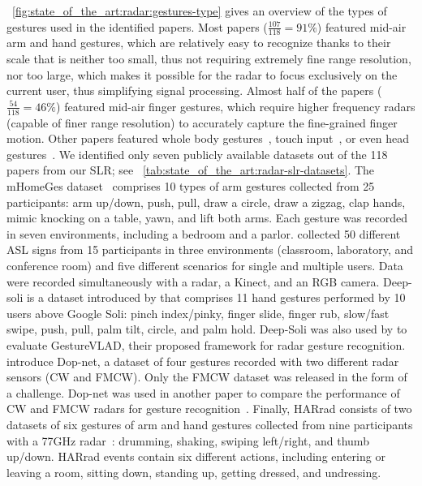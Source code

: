 \fig~\ref{fig:state_of_the_art:radar:gestures-type} gives an overview of the types of gestures used in the identified papers. Most papers ($\frac{107}{118}=91\%$) featured mid-air arm and hand gestures, which are relatively easy to recognize thanks to their scale that is neither too small, thus not requiring extremely fine range resolution, nor too large, which makes it possible for the radar to focus exclusively on the current user, thus simplifying signal processing. Almost half of the papers ($\frac{54}{118}=46\%$) featured mid-air finger gestures, which require higher frequency radars (capable of finer range resolution) to accurately capture the fine-grained finger motion. Other papers featured whole body gestures~\cite{Li:2009,Li:2020b,Vandersmissen:2020}, touch input~\cite{Copic:2019,Wu:2020}, or even head gestures~\cite{Wan:2014}.
%
We identified only seven publicly available datasets out of the 118 papers from our SLR; see \tab~\ref{tab:state_of_the_art:radar-slr-datasets}. 
The mHomeGes dataset~\cite{Liu:2020b} comprises 10 types of arm gestures collected from 25 participants: arm up/down, push, pull, draw a circle, draw a zigzag, clap hands, mimic knocking on a table, yawn, and lift both arms. Each gesture was recorded in seven environments, including a bedroom and a parlor.
\cite{Santhalingam:2020b} collected 50 different ASL signs from 15 participants in three environments (classroom, laboratory, and conference room) and five different scenarios for single and multiple users. Data were recorded simultaneously with a radar, a Kinect, and an RGB camera.
%
Deep-soli is a dataset introduced by \cite{Wang:2016} that comprises 11 hand gestures performed by 10 users above Google Soli: pinch index/pinky, finger slide, finger rub, slow/fast swipe, push, pull, palm tilt, circle, and palm hold. Deep-Soli was also used by \cite{Berenguer:2019} to evaluate GestureVLAD, their proposed framework for radar gesture recognition.
%
\cite{Ritchie:2020} introduce Dop-net, a dataset of four gestures recorded with two different radar sensors (CW and FMCW). Only the FMCW dataset was released in the form of a challenge. Dop-net was used in another paper to compare the performance of CW and FMCW radars for gesture recognition~\cite{Bannon:2020}.
%
Finally, HARrad consists of two datasets of six gestures of arm and hand gestures collected from nine participants with a 77GHz radar~\cite{Vandersmissen:2020}: drumming, shaking, swiping left/right, and thumb up/down. HARrad events contain six different actions, including entering or leaving a room, sitting down, standing up, getting dressed, and undressing.

